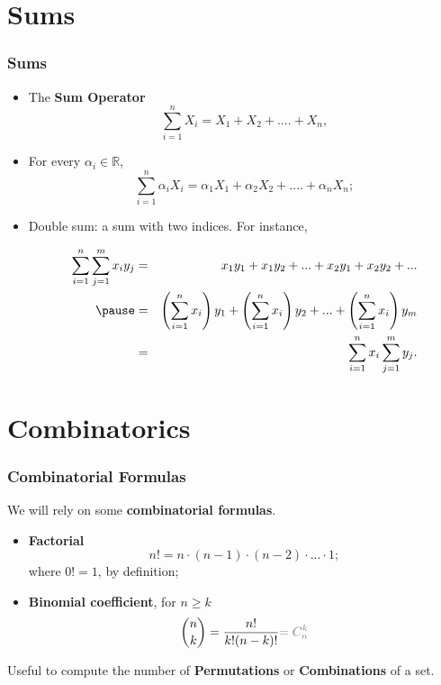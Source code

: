 \documentclass[notes=show]{beamer}\usepackage[]{graphicx}\usepackage[]{color}
\newcommand{\bea}{\begin{eqnarray}}
\newcommand{\eea}{\end{eqnarray}}
\begin{document}
\section{Sums}

\begin{frame}
\frametitle{Sums}
\begin{itemize}
\item The \textbf{Sum Operator} $$\sum_{i=1}^{n} X_{i} = X_1 + X_2 +....+ X_n,$$
\pause
\item For every $\alpha_i \in \mathbb{R}$,  $$\sum_{i=1}^{n} \alpha_i X_{i} = \alpha_1 X_1 + \alpha_2 X_2 +....+ \alpha_n X_n;$$
\pause
\item Double sum: a sum with two indices. For instance,
\begin{small}
\bea
\sum_{i=1}^{n} \sum_{j=1}^{m}  x_{i}y_{j}  &=& x_1y_1 + x_1 y_2 +... +x_2y_1+ x_2y_2 +... \nonumber \\ \pause
&=& \left(\sum_{i=1}^{n} x_i\right) y_1 +  \left(\sum_{i=1}^{n} x_i\right) y_2 + ... +  \left(\sum_{i=1}^{n} x_i\right) y_m  \nonumber \\
&=& \sum_{i=1}^{n} x_i \sum_{j=1}^{m} y_j. \nonumber
\eea
\end{small}
\end{itemize}
\end{frame}

\section{Combinatorics}

\begin{frame}
\frametitle{Combinatorial Formulas}

We will rely on some \textbf{combinatorial formulas}.

\begin{itemize}
\item \textbf{Factorial}
$$
n! = n \cdot (n-1) \cdot (n-2) \cdot ... \cdot 1;
$$
where $0! =1$, by definition;
\vspace{0.4cm}
\pause
\item \textbf{Binomial coefficient}, for $n \geq k$
$$
\binom n k =\frac{n!}{k!(n-k)!} \color{gray}{=C^{k}_n}\color{black}
$$
\end{itemize}

\pause
Useful to compute the number of \textbf{Permutations} or \textbf{Combinations} of a set.
\end{frame}
\end{document}
